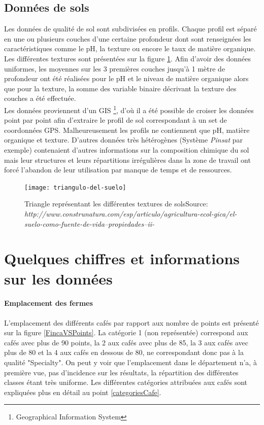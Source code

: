 \subsection{Données de sols} 
Les données de qualité de sol sont subdivisées en profils. Chaque profil est séparé en une ou plusieurs couches d’une certaine profondeur dont sont renseignées les caractéristiques comme le pH, la texture ou encore le taux de matière organique. Les différentes textures sont présentées sur la figure \ref{TriangleTexture}. Afin d'avoir des données uniformes, les moyennes sur les 3 premières couches jusqu'à 1 mètre de profondeur ont été réalisées pour le pH et le niveau de matière organique alors que pour la texture, la somme des variable binaire décrivant la texture des couches a été effectuée. \\


\noindent Les données proviennent d'un GIS \footnote{Geographical Information System}, d'où il a été possible de croiser les données point par point afin d'extraire le profil de sol correspondant à un set de coordonnées GPS. Malheureusement les profils ne contiennent que pH, matière organique et texture. D'autres données très hétérogènes (Système \textit{Pinsat} par exemple) contenaient d'autres informations sur la composition chimique du sol mais leur structures et leurs répartitions irrégulières dans la zone de travail ont forcé l'abandon de leur utilisation par manque de temps et de ressources.

\begin{figure}[H]
	\centering
	\texttt{[image: triangulo-del-suelo]}
	\caption{\label{TriangleTexture} Triangle représentant les différentes textures de sols\newline Source: \textit{http://www.construnatura.com/esp/articulo/agricultura-ecol-gica/el-suelo-como-fuente-de-vida--propiedades--ii-}}
\end{figure}





\newpage
\section{Quelques chiffres et informations sur les données}

\paragraph{Emplacement des fermes}\label{EmpFermes} L'emplacement des différents cafés par rapport aux nombre de points est présenté sur la figure \ref{FincaVSPoints}. La catégorie 1 (non représentée) correspond aux cafés avec plus de 90 points, la 2 aux cafés avec plus de 85, la 3 aux cafés avec plus de 80 et la 4 aux cafés en dessous de 80, ne correspondant donc pas à la qualité "Specialty". On peut y voir que l'emplacement dans le département n'a, à première vue, pas d'incidence sur les résultats, la répartition des différentes classes étant très uniforme. Les différentes catégories attribuées aux cafés sont expliquées plus en détail au point \ref{categoriesCafe}.



